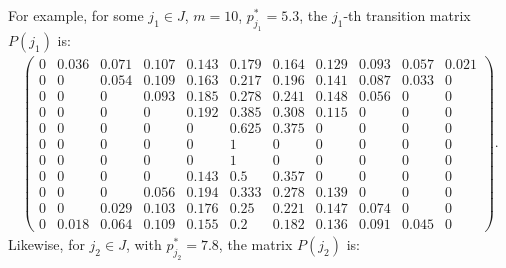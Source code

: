 \documentclass{article}
\begin{document}
For example, for some $j_1 \in J$, $m = 10$, $p_{j_1}^* = 5.3$, the $j_1$-th transition matrix $P(j_1)$ is:
\begin{align*}
	\begin{pmatrix}
		0     & 0.036 & 0.071 & 0.107 & 0.143 & 0.179 & 0.164 & 0.129 & 0.093 & 0.057 & 0.021 \\
		0     & 0     & 0.054 & 0.109 & 0.163 & 0.217 & 0.196 & 0.141 & 0.087 & 0.033 & 0     \\
		0     & 0     & 0     & 0.093 & 0.185 & 0.278 & 0.241 & 0.148 & 0.056 & 0     & 0     \\
		0     & 0     & 0     & 0     & 0.192 & 0.385 & 0.308 & 0.115 & 0     & 0     & 0     \\
		0     & 0     & 0     & 0     & 0     & 0.625 & 0.375 & 0     & 0     & 0     & 0     \\
		0     & 0     & 0     & 0     & 0     & 1     & 0     & 0     & 0     & 0     & 0     \\
		0     & 0     & 0     & 0     & 0     & 1     & 0     & 0     & 0     & 0     & 0     \\
		0     & 0     & 0     & 0     & 0.143 & 0.5   & 0.357 & 0     & 0     & 0     & 0     \\
		0     & 0     & 0     & 0.056 & 0.194 & 0.333 & 0.278 & 0.139 & 0     & 0     & 0     \\
		0     & 0     & 0.029 & 0.103 & 0.176 & 0.25  & 0.221 & 0.147 & 0.074 & 0     & 0     \\
		0     & 0.018 & 0.064 & 0.109 & 0.155 & 0.2   & 0.182 & 0.136 & 0.091 & 0.045 & 0
	\end{pmatrix}.
\end{align*}
Likewise, for $j_2 \in J$, with $p^*_{j_2} = 7.8$, the matrix $P(j_2)$ is:
\end{document}
